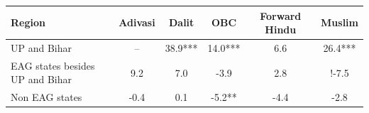 \begin{tabular}{lccccc}
\hline
Region & Adivasi & Dalit & OBC & Forward Hindu & Muslim \\
\hline
UP and Bihar&--&38.9***&14.0***&6.6&26.4***\\
EAG states besides UP and Bihar&9.2&7.0&-3.9&2.8&!-7.5\\
Non EAG states&-0.4&0.1&-5.2**&-4.4&-2.8\\
\hline
\end{tabular}
